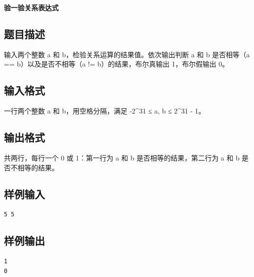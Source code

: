 \documentclass{article}
\newcommand{\problemname}[1]{\begin{center}\Large\bfseries #1\end{center}}
\begin{document}
\problemname{验一验关系表达式}

\subsection*{题目描述}
输入两个整数 a 和 b，检验关系运算的结果值。依次输出判断 a 和 b 是否相等（a == b）以及是否不相等（a != b）的结果，布尔真输出 1，布尔假输出 0。

\subsection*{输入格式}
一行两个整数 a 和 b，用空格分隔，满足 -2^31 ≤ a, b ≤ 2^31 - 1。

\subsection*{输出格式}
共两行，每行一个 0 或 1：第一行为 a 和 b 是否相等的结果，第二行为 a 和 b 是否不相等的结果。

\subsection*{样例输入}
\begin{verbatim}
5 5
\end{verbatim}

\subsection*{样例输出}
\begin{verbatim}
1
0
\end{verbatim}
\end{document}
